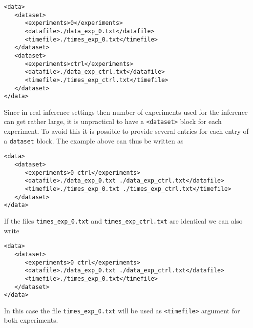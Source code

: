\documentclass[11pt]{article} %
\begin{document}
\begin{tcolorbox}
\begin{verbatim}
<data>
   <dataset>
      <experiments>0</experiments>
      <datafile>./data_exp_0.txt</datafile>
      <timefile>./times_exp_0.txt</timefile>		
   </dataset>
   <dataset>
      <experiments>ctrl</experiments>
      <datafile>./data_exp_ctrl.txt</datafile>
      <timefile>./times_exp_ctrl.txt</timefile>		
   </dataset>
</data>
\end{verbatim}
\end{tcolorbox}
Since in real inference settings then number of experiments used for the inference can get rather large, it is unpractical to have a \texttt{<dataset>} block for each experiment. To avoid this it is possible to provide several entries for each entry of a \texttt{dataset} block. The example above can thus be written as 
\begin{tcolorbox}
\begin{verbatim}
<data>
   <dataset>
      <experiments>0 ctrl</experiments>
      <datafile>./data_exp_0.txt ./data_exp_ctrl.txt</datafile>
      <timefile>./times_exp_0.txt ./times_exp_ctrl.txt</timefile>		
   </dataset>
</data>
\end{verbatim}
\end{tcolorbox}

If the files \texttt{times\_exp\_0.txt} and \texttt{times\_exp\_ctrl.txt} are identical we can also write 
\begin{tcolorbox}
\begin{verbatim}
<data>
   <dataset>
      <experiments>0 ctrl</experiments>
      <datafile>./data_exp_0.txt ./data_exp_ctrl.txt</datafile>
      <timefile>./times_exp_0.txt</timefile>		
   </dataset>
</data>
\end{verbatim}
\end{tcolorbox}

In this case the file \texttt{times\_exp\_0.txt} will be used as \texttt{<timefile>} argument for both experiments. 
\end{document}
